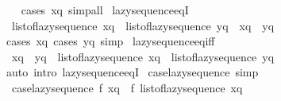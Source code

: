 \begin{isabellebody}
%
\isadelimproof
\ \ %
\endisadelimproof
%
\isatagproof
{}\isamarkupfalse%
\ {\isacharparenleft}{\kern0pt}cases\ xq{\isacharparenright}{\kern0pt}\ simp{\isacharunderscore}{\kern0pt}all%
\endisatagproof
{\isafoldproof}%
%
\isadelimproof
\isanewline
%
\endisadelimproof
\isanewline
{}\isamarkupfalse%
\ lazy{\isacharunderscore}{\kern0pt}sequence{\isacharunderscore}{\kern0pt}eqI{\isacharcolon}{\kern0pt}\isanewline
\ \ {\isachardoublequoteopen}list{\isacharunderscore}{\kern0pt}of{\isacharunderscore}{\kern0pt}lazy{\isacharunderscore}{\kern0pt}sequence\ xq\ {\isacharequal}{\kern0pt}\ list{\isacharunderscore}{\kern0pt}of{\isacharunderscore}{\kern0pt}lazy{\isacharunderscore}{\kern0pt}sequence\ yq\ {\isasymLongrightarrow}\ xq\ {\isacharequal}{\kern0pt}\ yq{\isachardoublequoteclose}\isanewline
%
\isadelimproof
\ \ %
\endisadelimproof
%
\isatagproof
{}\isamarkupfalse%
\ {\isacharparenleft}{\kern0pt}cases\ xq{\isacharcomma}{\kern0pt}\ cases\ yq{\isacharparenright}{\kern0pt}\ simp%
\endisatagproof
{\isafoldproof}%
%
\isadelimproof
\isanewline
%
\endisadelimproof
\isanewline
{}\isamarkupfalse%
\ lazy{\isacharunderscore}{\kern0pt}sequence{\isacharunderscore}{\kern0pt}eq{\isacharunderscore}{\kern0pt}iff{\isacharcolon}{\kern0pt}\isanewline
\ \ {\isachardoublequoteopen}xq\ {\isacharequal}{\kern0pt}\ yq\ {\isasymlongleftrightarrow}\ list{\isacharunderscore}{\kern0pt}of{\isacharunderscore}{\kern0pt}lazy{\isacharunderscore}{\kern0pt}sequence\ xq\ {\isacharequal}{\kern0pt}\ list{\isacharunderscore}{\kern0pt}of{\isacharunderscore}{\kern0pt}lazy{\isacharunderscore}{\kern0pt}sequence\ yq{\isachardoublequoteclose}\isanewline
%
\isadelimproof
\ \ %
\endisadelimproof
%
\isatagproof
{}\isamarkupfalse%
\ {\isacharparenleft}{\kern0pt}auto\ intro{\isacharcolon}{\kern0pt}\ lazy{\isacharunderscore}{\kern0pt}sequence{\isacharunderscore}{\kern0pt}eqI{\isacharparenright}{\kern0pt}%
\endisatagproof
{\isafoldproof}%
%
\isadelimproof
\isanewline
%
\endisadelimproof
\isanewline
{}\isamarkupfalse%
\ case{\isacharunderscore}{\kern0pt}lazy{\isacharunderscore}{\kern0pt}sequence\ {\isacharbrackleft}{\kern0pt}simp{\isacharbrackright}{\kern0pt}{\isacharcolon}{\kern0pt}\isanewline
\ \ {\isachardoublequoteopen}case{\isacharunderscore}{\kern0pt}lazy{\isacharunderscore}{\kern0pt}sequence\ f\ xq\ {\isacharequal}{\kern0pt}\ f\ {\isacharparenleft}{\kern0pt}list{\isacharunderscore}{\kern0pt}of{\isacharunderscore}{\kern0pt}lazy{\isacharunderscore}{\kern0pt}sequence\ xq{\isacharparenright}{\kern0pt}{\isachardoublequoteclose}\isanewline

\end{isabellebody}
